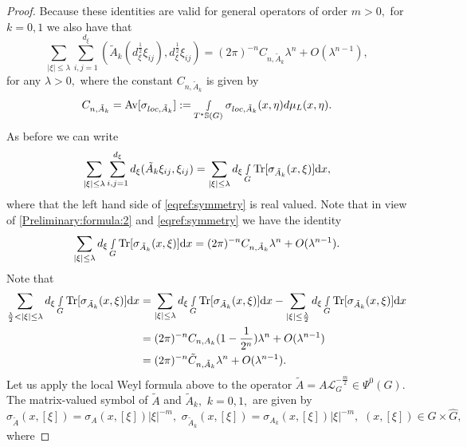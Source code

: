 \documentclass[12pt, reqno]{amsart}
\theoremstyle{definition}
\theoremstyle{remark}
\numberwithin{equation}{section}
\begin{document}
\begin{proof}
Because these identities are valid for general operators of order $m>0,$ for $k=0,1$ we also have that
\begin{equation}\label{Preliminary:formula:2}
  \sum_{|\xi|\leq \lambda}  \sum_{i,j=1}^{d_\xi}(\tilde A_k(d_\xi^{\frac{1}{2}}\xi_{ij}),d_\xi^{\frac{1}{2}}\xi_{ij})= (2\pi)^{-n}C_{n,\tilde A_k}\lambda^n+O(\lambda^{n-1}),
\end{equation}for any $\lambda>0,$ where  the constant $C_{n,\tilde{A}_k} $ is given by
\begin{equation}\label{The:Constant}
  C_{n,\tilde{A}_k}=   \textnormal{Av}[\sigma_{loc,\tilde A_k}]:=\smallint\limits_{ T^{*}\mathbb{S}(G)}\sigma_{loc,\tilde A_k}(x,\eta)d\mu_{L}(x,\eta).
\end{equation}
As before we can write
\begin{equation}\label{eqref:symmetry}
    \sum_{|\xi|\leq \lambda}  \sum_{i,j=1}^{d_\xi}d_\xi(\tilde A_k\xi_{ij},\xi_{ij})=  \sum_{|\xi|\leq \lambda}d_\xi\smallint\limits_{G}\textnormal{Tr}[\sigma_{\tilde A_k}(x,\xi)]\textnormal{d}x,
\end{equation}where that the left hand side of \eqref{eqref:symmetry} is real valued. Note that in view of \eqref{Preliminary:formula:2} and \eqref{eqref:symmetry}  we have the identity
\begin{equation}\label{eqref:symmetry:22}
      \sum_{|\xi|\leq \lambda}d_\xi\smallint\limits_{G}\textnormal{Tr}[\sigma_{\tilde A_k}(x,\xi)]\textnormal{d}x= (2\pi)^{-n}C_{n,\tilde A_k}\lambda^n+O(\lambda^{n-1}).
\end{equation} Note that
\begin{align*}
    \sum_{\frac{\lambda}{2}<|\xi|\leq \lambda}d_\xi\smallint\limits_{G}\textnormal{Tr}[\sigma_{\tilde A_k}(x,\xi)]\textnormal{d}x&=\sum_{|\xi|\leq \lambda}d_\xi\smallint\limits_{G}\textnormal{Tr}[\sigma_{\tilde A_k}(x,\xi)]\textnormal{d}x-\sum_{|\xi|\leq\frac{\lambda}{2} }d_\xi\smallint\limits_{G}\textnormal{Tr}[\sigma_{\tilde A_k}(x,\xi)]\textnormal{d}x\\
    &=(2\pi)^{-n}C_{n,A_k}(1-\frac{1}{2^n})\lambda^n+O(\lambda^{n-1})\\
    &=(2\pi)^{-n}\tilde{C}_{n,\tilde A_k}\lambda^n+O(\lambda^{n-1}).
\end{align*}Let us apply the local Weyl formula above to the operator $\tilde A=A\mathcal{L}_G^{-\frac{m}{2}}\in \Psi^{0}(G).$  The matrix-valued symbol of $\tilde A$ and $\tilde A_k,$ $k=0,1,$ are given by $$\sigma_{\tilde A}(x,[\xi])=\sigma_{A}(x,[\xi])| \xi |^{-m},\,\,\sigma_{\tilde A_k}(x,[\xi])=\sigma_{A_k}(x,[\xi])|\xi|^{-m},\,\, (x,[\xi])\in G\times \widehat{G},$$ where 

\end{proof}
\end{document}
